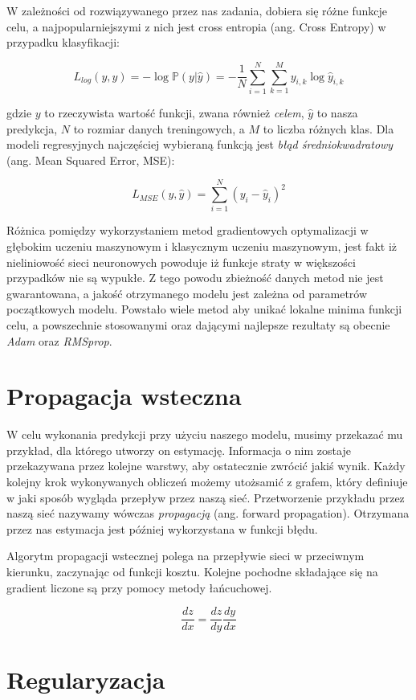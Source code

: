 \documentclass[licencjacka]{pracamgr}
\begin{document}
W zależności od rozwiązywanego przez nas zadania, dobiera się różne funkcje celu, a najpopularniejszymi z nich jest cross entropia (ang. Cross Entropy) w przypadku klasyfikacji:

$$ L_{log}(y, \hat{y}) = -\log\mathbb{P}(y | \hat{y}) = 
-\frac{1}{N} \sum_{i = 1}^N \sum_{k = 1}^M y_{i, k} \log \hat{y}_{i, k}
$$

gdzie $y$ to rzeczywista wartość funkcji, zwana również \emph{celem}, $\hat{y}$ to nasza predykcja, $N$ to rozmiar danych treningowych, a $M$ to liczba różnych klas. Dla modeli regresyjnych najczęściej wybieraną funkcją jest \emph{błąd średniokwadratowy} (ang. Mean Squared Error, MSE):

$$ L_{MSE}(y, \hat{y}) = \sum_{i = 1}^N (y_i - \hat{y}_i)^2$$

Różnica pomiędzy wykorzystaniem metod gradientowych optymalizacji w głębokim uczeniu maszynowym i klasycznym uczeniu maszynowym, jest fakt iż nieliniowość sieci neuronowych powoduje iż funkcje straty w większości przypadków nie są wypukłe. Z tego powodu zbieżność danych metod nie jest gwarantowana, a jakość otrzymanego modelu jest zależna od parametrów początkowych modelu. Powstało wiele metod aby unikać lokalne minima funkcji celu, a powszechnie stosowanymi oraz dającymi najlepsze rezultaty są obecnie \emph{Adam} oraz \emph{RMSprop}. 

\section{Propagacja wsteczna}

W celu wykonania predykcji przy użyciu naszego modelu, musimy przekazać mu przykład, dla którego utworzy on estymację. Informacja o nim zostaje przekazywana przez kolejne warstwy, aby ostatecznie zwrócić jakiś wynik. Każdy kolejny krok wykonywanych obliczeń możemy utożsamić z grafem, który definiuje w jaki sposób wygląda przepływ przez naszą sieć. Przetworzenie przykładu przez naszą sieć nazywamy wówczas \emph{propagacją} (ang. forward propagation). Otrzymana przez nas estymacja jest później wykorzystana w funkcji błędu. 

Algorytm propagacji wstecznej polega na przepływie sieci w przeciwnym kierunku, zaczynając od funkcji kosztu. Kolejne pochodne składające się na gradient liczone są przy pomocy metody łańcuchowej.

$$ \frac{dz}{dx} = \frac{dz}{dy} \frac{dy}{dx} $$
 

\section{Regularyzacja}
\end{document}
